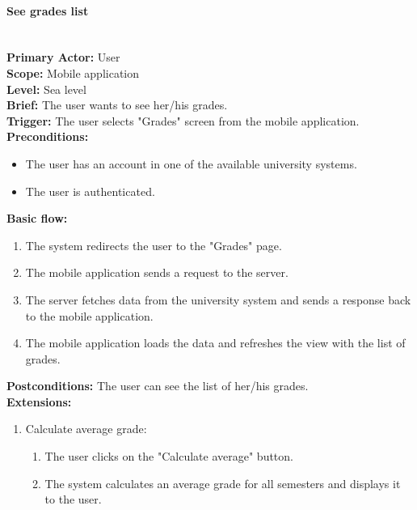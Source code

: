 
\paragraph{\large{See grades list}}\mbox{}\\[2pt]
\textbf{Primary Actor:} User\\
\textbf{Scope:} Mobile application\\
\textbf{Level:} Sea level\\
\textbf{Brief:} The user wants to see her/his grades.\\
\textbf{Trigger:} The user selects "Grades" screen from the mobile application.\\
\textbf{Preconditions:}
\begin{itemize}
    \item The user has an account in one of the available university systems.
    \item The user is authenticated.
\end{itemize}
\textbf{Basic flow:}
\begin{enumerate}
    \item The system redirects the user to the "Grades" page.
    \item The mobile application sends a request to the server.
    \item The server fetches data from the university system and sends a response back to the mobile application.
    \item The mobile application loads the data and refreshes the view with the list of grades.
\end{enumerate}
\textbf{Postconditions:}
The user can see the list of her/his grades.\\
\textbf{Extensions:}
\begin{enumerate}[label=\alph*.]
    \item Calculate average grade:
    \begin{enumerate}
        \item The user clicks on the "Calculate average" button.
        \item The system calculates an average grade for all semesters and displays it to the user.
    \end{enumerate}
\end{enumerate}


